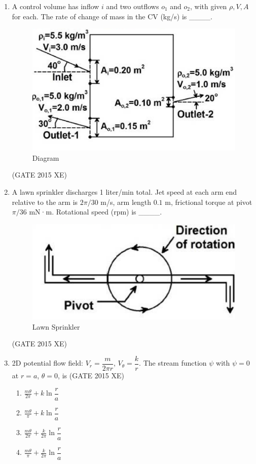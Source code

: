 \documentclass[journal,12pt,onecolumn]{IEEEtran}
\begin{document}
\begin{enumerate}
\item A control volume has inflow $i$ and two outflows $o_1$ and $o_2$, with given $\rho, V, A$ for each. The rate of change of mass in the CV (kg/s) is \_\_\_\_.


\begin{figure}[htbp]
  \centering
  \includegraphics[width=.68\columnwidth]{figs/B/fig5.png} 
  \caption{Diagram}
  \label{fig:figs/B/fig5.png}
\end{figure}
\hfill{(GATE 2015 XE)} \\


\item A lawn sprinkler discharges 1 liter/min total. Jet speed at each arm end relative to the arm is $2\pi/30$ m/s, arm length $0.1$ m, frictional torque at pivot $\pi/36$ mN·m. Rotational speed (rpm) is \_\_\_\_.

\begin{figure}[htbp]
  \centering
  \includegraphics[width=.5\columnwidth]{figs/B/fig6.png} 
  \caption{Lawn Sprinkler}
  \label{fig:figs/B/fig6.png}
\end{figure}
\hfill{(GATE 2015 XE)} \\

\newpage

\item 2D potential flow field: $V_r = \dfrac{m}{2\pi r}$, $V_\theta = \dfrac{k}{r}$. The stream function $\psi$ with $\psi=0$ at $r=a$, $\theta=0$, is
\hfill{(GATE 2015 XE)} \\
\begin{multicols}{4}
\begin{enumerate}
\item $\frac{m\theta}{2\pi} + k \ln\dfrac{r}{a}$
\item $\frac{m\theta}{\pi} + k \ln\dfrac{r}{a}$
\item $\frac{m\theta}{2\pi} + \frac{k}{2\pi}\ln\dfrac{r}{a}$
\item $\frac{m\theta}{\pi} + \frac{k}{2\pi}\ln\dfrac{r}{a}$
\end{enumerate}
\end{multicols}


\end{enumerate}
\end{document}
